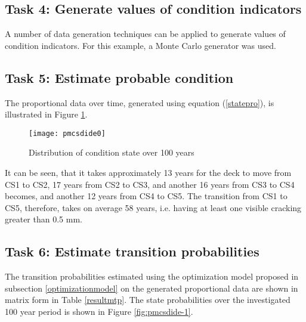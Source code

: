 \documentclass[Journal]{ascelike}
\begin{document}
\subsection{Task 4: Generate values of condition indicators}
A number of data generation techniques can be applied to generate
values of condition indicators. For this example, a Monte Carlo generator
was used. 

\subsection{Task 5: Estimate probable condition}
The proportional data over time, generated using equation (\ref{statepro}),
is illustrated in Figure \ref{fig:pmcsdide}. %

\begin{figure}[h]
\centering \texttt{[image: pmcsdide0]} \caption{Distribution of condition state over 100 years}
\label{fig:pmcsdide} 
\end{figure}

It can be seen, that it takes approximately 13 years for the deck
to move from CS1 to CS2, 17 years from CS2 to CS3, and another 16
years from CS3 to CS4 becomes, and another 12 years from CS4 to CS5.
The transition from CS1 to CS5, therefore, takes on average 58 years,
i.e. having at least one visible cracking greater than 0.5 mm.


\subsection{Task 6: Estimate transition probabilities}

The transition probabilities estimated using the optimization model
proposed in subsection \ref{optimizationmodel} on the generated proportional
data are shown in matrix form in Table \ref{resultmtp}. The state
probabilities over the investigated 100 year period is shown in Figure
\ref{fig:pmcsdide-1}.
 
\end{document}
